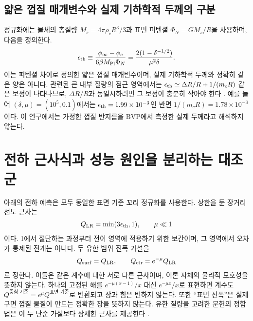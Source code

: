 \documentclass[11pt,a4paper]{article}
\begin{document}
\subsection{얇은 껍질 매개변수와 실제 기하학적 두께의 구분}
정규화에는 물체의 총질량 $M_s=4\pi\rho_cR^3/3$과 표면 퍼텐셜
$\Phi_N=GM_s/R$을 사용하며, 다음을 정의한다.
\begin{equation}
 \epsilon_{\mathrm{th}}\equiv\frac{\phi_\infty-\phi_c}{6\beta M_{\mathrm{Pl}}\Phi_N}
 =\frac{2(1-\delta^{-1/2})}{\mu^2\delta}.
 \label{eq:eps}
\end{equation}
이는 퍼텐셜 차이로 정의한 얇은 껍질 매개변수이며, 실제 기하학적 두께와 정확히
같은 양은 아니다. 관련된 큰 내부 질량의 점근 영역에서는
$\epsilon_{\mathrm{th}}\simeq\Delta R/R+1/(m_cR)$ 같은 보정이 나타나므로, $\Delta R/R$과
동일시하려면 그 보정이 충분히 작아야 한다 \cite{TamakiTsujikawa}.
예를 들어 $(\delta,\mu)=(10^5,0.1)$에서는 $\epsilon_{\mathrm{th}}=1.99\times10^{-3}$인 반면
$1/(m_cR)=1.78\times10^{-3}$이다. 이 연구에서는 가정한 껍질 반지름을 BVP에서
측정한 실제 두께라고 해석하지 않는다.

\section{전하 근사식과 성능 원인을 분리하는 대조군}
아래의 전하 예측은 모두 동일한 표면 기준 꼬리 정규화를 사용한다.
상한을 둔 장거리 선도 근사는
\begin{equation}
 Q_{\mathrm{LR}}=\min(3\epsilon_{\mathrm{th}},1),\qquad \mu\ll1
\end{equation}
이다. 1에서 절단하는 과정부터 전이 영역에 적용하기 위한 보간이며, 그 영역에서
오차가 통제된 전개는 아니다. 두 유한 범위 진폭 가설을
\begin{equation}
 Q_{\mathrm{surf}}=Q_{\mathrm{LR}},\qquad Q_{\mathrm{ctr}}=e^{-\mu}Q_{\mathrm{LR}}
\end{equation}
로 정한다. 이들은 같은 계수에 대한 서로 다른 근사이며, 이론 자체의 물리적
모호성을 뜻하지 않는다. 하나의 고정된 해를 $e^{-\mu(x-1)}/x$ 대신
$e^{-\mu x}/x$로 표현하면 계수도
$Q^{\text{중심 기준}}=e^\mu Q^{\text{표면 기준}}$로 변환되고 장과 힘은 변하지
않는다. 또한 ``표면 진폭''은 실제 구면 껍질 물질이 만드는 정확한 장을 뜻하지
않는다. 유한 질량을 고려한 문헌의 정합법은 이 두 단순 가설보다 상세한 근사를
제공한다 \cite{TamakiTsujikawa}.
\end{document}
